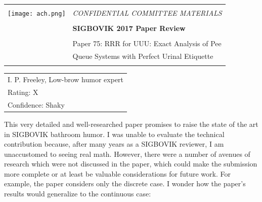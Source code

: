 \documentclass[12pt]{article}
\begin{document}
{\sffamily
\begin{tabular}{ll}
\multirow{3}{*}{\texttt{[image: ach.png]}}\\
& \Large{\em CONFIDENTIAL COMMITTEE MATERIALS} \\
&\\
& \textbf{\Huge{SIGBOVIK 2017 Paper Review}} \\
&\\
& \LARGE{Paper 75: RRR for UUU: Exact Analysis of Pee}\\
& \LARGE{Queue Systems with Perfect Urinal Etiquette} \\
&\\
\hline
\end{tabular}}
\vspace{2em}
\thispagestyle{empty}

{\large\bf
\begin{tabular}{l}
I. P. Freeley, Low-brow humor expert\\
Rating: X\\
Confidence: Shaky\\
\end{tabular}}
\vspace{1em}

This very detailed and well-researched paper promises to raise the state of
the art in SIGBOVIK bathroom humor. I was unable to evaluate the technical
contribution because, after many years as a SIGBOVIK reviewer, I am unaccustomed
to seeing real math. However, there were a number of avenues of research
which were not discussed in the paper, which could make the submission more
complete or at least be valuable considerations for future work. For example,
the paper considers only the discrete case. I wonder how the paper's results
would generalize to the continuous case:

\end{document}
